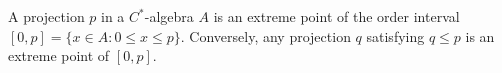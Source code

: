 A projection $p$ in a $C^*$-algebra $A$ is an extreme point of the order interval $[0, p] = \{x \in A : 0 \leq x \leq p\}$. Conversely, any projection $q$ satisfying $q \leq p$ is an extreme point of $[0, p]$.
